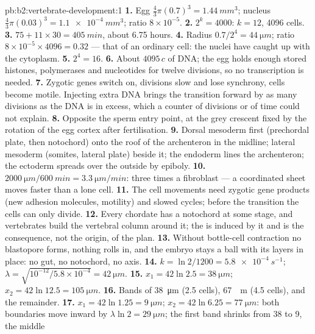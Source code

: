 \begin{solution}{pb:b2:vertebrate-development:1}
\textbf{1.} Egg $\tfrac43\pi(0.7)^{3} = \qty{1.44}{mm^3}$; nucleus
$\tfrac43\pi(0.03)^{3} = \qty{1.1e-4}{mm^3}$; ratio $8\times
10^{-5}$.
\textbf{2.} $2^{k} = 4000$: $k = 12$, 4096 cells.
\textbf{3.} $75 + 11\times 30 = \qty{405}{min}$, about 6.75 hours.
\textbf{4.} Radius $0.7/2^{4} = \qty{44}{\micro m}$; ratio $8\times
10^{-5}\times 4096 = 0.32$ --- that of an ordinary cell: the nuclei
have caught up with the cytoplasm.
\textbf{5.} $2^{4} = 16$.
\textbf{6.} About $4095\,c$ of DNA; the egg holds enough stored
histones, polymerases and nucleotides for twelve divisions, so no
transcription is needed.
\textbf{7.} Zygotic genes switch on, divisions slow and lose
synchrony, cells become motile. Injecting extra DNA brings the
transition forward by as many divisions as the DNA is in excess,
which a counter of divisions or of time could not explain.
\textbf{8.} Opposite the sperm entry point, at the grey crescent
fixed by the rotation of the egg cortex after fertilisation.
\textbf{9.} Dorsal mesoderm first (prechordal plate, then notochord)
onto the roof of the archenteron in the midline; lateral mesoderm
(somites, lateral plate) beside it; the endoderm lines the
archenteron; the ectoderm spreads over the outside by epiboly.
\textbf{10.} $\qty{2000}{\micro m}/\qty{600}{min} = \qty{3.3}{\micro
m/min}$: three times a fibroblast --- a coordinated sheet moves
faster than a lone cell.
\textbf{11.} The cell movements need zygotic gene products (new
adhesion molecules, motility) and slowed cycles; before the
transition the cells can only divide.
\textbf{12.} Every chordate has a notochord at some stage, and
vertebrates build the vertebral column around it; the 
is induced by it and is the consequence, not the origin, of the
plan.
\textbf{13.} Without bottle-cell contraction no blastopore forms,
nothing rolls in, and the embryo stays a ball with its layers in
place: no gut, no notochord, no axis.
\textbf{14.} $k = \ln 2/1200 = \qty{5.8e-4}{s^{-1}}$; $\lambda =
\sqrt{10^{-12}/5.8\times 10^{-4}} = \qty{42}{\micro m}$.
\textbf{15.} $x_1 = 42\ln 2.5 = \qty{38}{\micro m}$; $x_2 = 42\ln 12.5
= \qty{105}{\micro m}$.
\textbf{16.} Bands of \qty{38}{\micro m} (2.5 cells), \qty{67}{\micro
m} (4.5 cells), and the remainder.
\textbf{17.} $x_1 = 42\ln 1.25 = \qty{9}{\micro m}$; $x_2 = 42\ln 6.25
= \qty{77}{\micro m}$: both boundaries move inward by $\lambda\ln 2 =
\qty{29}{\micro m}$; the first band shrinks from 38 to 9, the middle

\end{solution}
